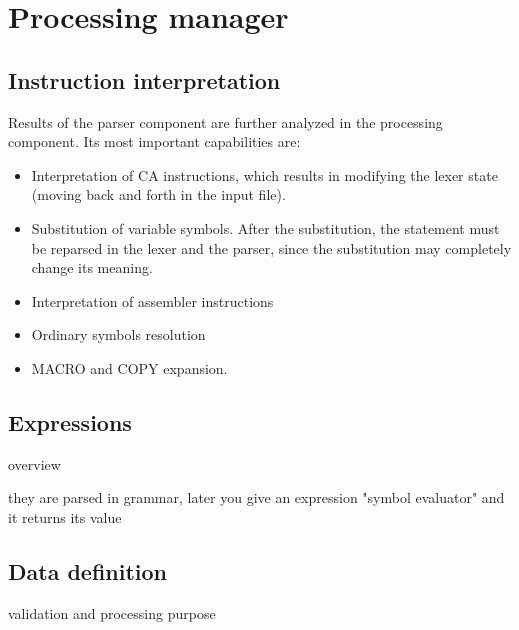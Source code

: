 \section{Processing manager}

\subsection{Instruction interpretation}

Results of the parser component are further analyzed in the processing component. Its most important capabilities are:
\begin{itemize}
	\item Interpretation of CA instructions, which results in modifying the lexer state (moving back and forth in the input file).
	\item Substitution of variable symbols. After the substitution, the statement must be reparsed in the lexer and the parser, since the substitution may completely change its meaning.
	\item Interpretation of assembler instructions
	\item Ordinary symbols resolution
	\item MACRO and COPY expansion.
\end{itemize}

\subsection{Expressions}
overview

they are parsed in grammar, later you give an expression "symbol evaluator" and it returns its value



\subsection{Data definition}

validation and processing purpose